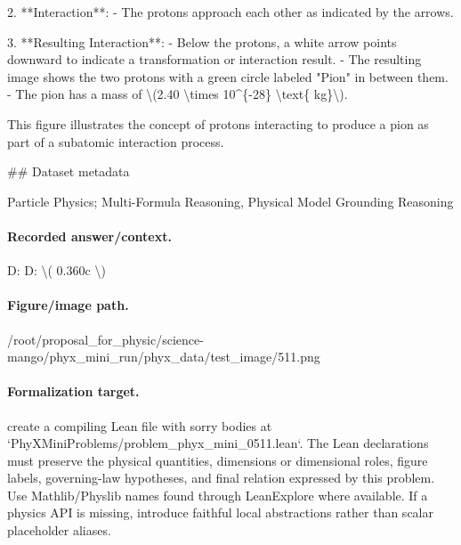 2. **Interaction**:
   - The protons approach each other as indicated by the arrows.

3. **Resulting Interaction**:
   - Below the protons, a white arrow points downward to indicate a transformation or interaction result.
   - The resulting image shows the two protons with a green circle labeled "Pion" in between them.
   - The pion has a mass of \textbackslash{}(2.40 \textbackslash{}times 10\textasciicircum{}\{-28\} \textbackslash{}text\{ kg\}\textbackslash{}).

This figure illustrates the concept of protons interacting to produce a pion as part of a subatomic interaction process.

\#\# Dataset metadata

Particle Physics; Multi-Formula Reasoning, Physical Model Grounding Reasoning

\paragraph{Recorded answer/context.}
D: D: \textbackslash{}( 0.360c \textbackslash{})

\paragraph{Figure/image path.}
/root/proposal\_for\_physic/science-mango/phyx\_mini\_run/phyx\_data/test\_image/511.png

\paragraph{Formalization target.}
create a compiling Lean file with sorry bodies at `PhyXMiniProblems/problem\_phyx\_mini\_0511.lean`. The Lean declarations must preserve the physical quantities, dimensions or dimensional roles, figure labels, governing-law hypotheses, and final relation expressed by this problem.
Use Mathlib/Physlib names found through LeanExplore where available. If a physics API is missing, introduce faithful local abstractions rather than scalar placeholder aliases.

